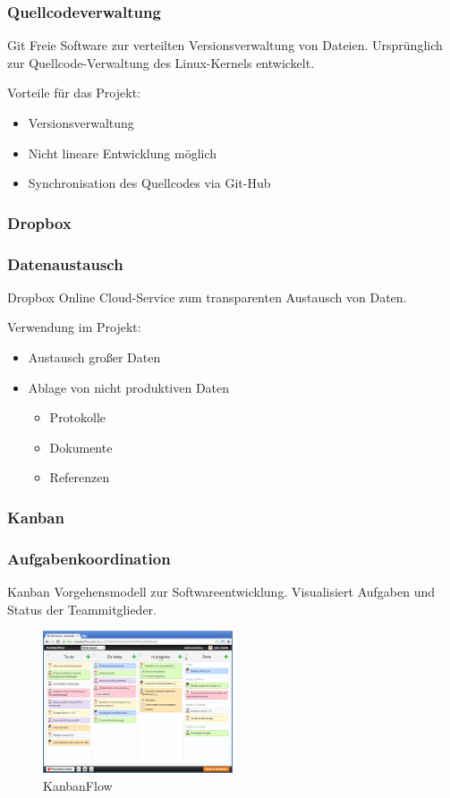 \begin{frame} 
  \frametitle{Quellcodeverwaltung}
  \begin{block}{Git}
   Freie Software zur verteilten Versionsverwaltung von Dateien. 
   Ursprünglich zur Quellcode-Verwaltung des Linux-Kernels entwickelt.
  \end{block}
  Vorteile für das Projekt:
    \begin{itemize}
      \item Versionsverwaltung
      \item Nicht lineare Entwicklung möglich
      \item Synchronisation des Quellcodes via Git-Hub
    \end{itemize}
\end{frame}

\subsubsection{Dropbox}
\begin{frame} 
  \frametitle{Datenaustausch}
  \begin{block}{Dropbox}
    Online Cloud-Service zum transparenten Austausch von Daten.
  \end{block}
  Verwendung im Projekt:
    \begin{itemize}
      \item Austausch großer Daten
      \item Ablage von nicht produktiven Daten
      \begin{itemize}
        \item Protokolle
        \item Dokumente
        \item Referenzen
      \end{itemize}
    \end{itemize}
\end{frame}

\subsubsection{Kanban}

\begin{frame} 
  \frametitle{Aufgabenkoordination}
  \begin{block}{Kanban}
     Vorgehensmodell zur Softwareentwicklung.
     Visualisiert Aufgaben und Status der Teammitglieder.
  \end{block}
    \begin{figure}[htbp]
      \centering
        \includegraphics[width=0.5\textwidth]{./chapters/Kanban.png}
        \caption{KanbanFlow}
        \label{fig:Kanban}
   \end{figure}
\end{frame}


